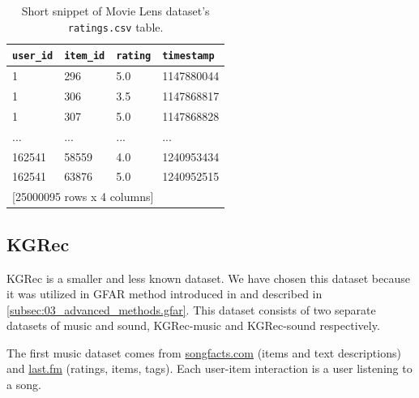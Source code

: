 \begin{table}[!ht]
\centering
\begin{tabular}{ l l l l }

\verb|user_id| & \verb|item_id| & \verb|rating| & \verb|timestamp| \\
    \hline
    1 &      296  &   5.0 & 1147880044 \\
    1 &      306  &   3.5 & 1147868817 \\
    1 &      307  &   5.0 & 1147868828 \\
  ... &      ...  &   ... &        ... \\
162541 &    58559  &   4.0 & 1240953434 \\
162541 &    63876  &   5.0 & 1240952515 \\ [1mm]
\multicolumn{4}{l}{{[25000095 rows x 4 columns]}}
\end{tabular}
\caption{Short snippet of Movie Lens dataset's \texttt{ratings.csv} table.}
\label{table:5.1_ML_ratings}
\end{table}





\subsection{KGRec}
\label{subsec:04_single_user_datasets.kgrec}
KGRec is a smaller and less known dataset. We have chosen this dataset because it was utilized in GFAR method introduced in \cite{GFAR-kaya2020} and described in \ref{subsec:03_advanced_methods.gfar}. This dataset consists of two separate datasets of music and sound, KGRec-music and KGRec-sound respectively.

The first music dataset comes from \href{https://www.songfacts.com/}{songfacts.com} (items and text descriptions) and \href{https://www.last.fm/}{last.fm} (ratings, items, tags). Each user-item interaction is a user listening to a song.

